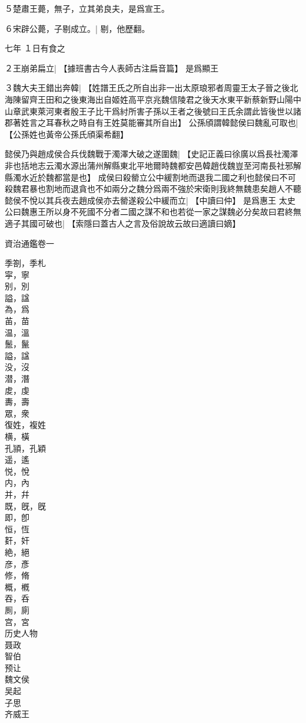 ５楚肅王薨，無子，立其弟良夫，是爲宣王。

６宋辟公薨，子剔成立。|{
	剔，他歷翻。
	}



七年
１日有食之

２王崩弟扁立|{
	【據班書古今人表師古注扁音篇】
	}
是爲顯王

３魏大夫王錯出奔韓|{
	【姓譜王氏之所自出非一出太原琅邪者周靈王太子晉之後北海陳留齊王田和之後東海出自姬姓高平京兆魏信陵君之後天水東平新蔡新野山陽中山章武東萊河東者殷王子比干爲紂所害子孫以王者之後號曰王氏余謂此皆後世以諸郡著姓言之耳春秋之時自有王姓莫能審其所自出】
	}
公孫頎謂韓懿侯曰魏亂可取也|{
	【公孫姓也黃帝公孫氏頎渠希翻】
	}

懿侯乃與趙成侯合兵伐魏戰于濁澤大破之遂圍魏|{
	【史記正義曰徐廣以爲長社濁澤非也括地志云濁水源出蒲州解縣東北平地爾時魏都安邑韓趙伐魏豈至河南長社邪解縣濁水近於魏都當是也】
	}
成侯曰殺罃立公中緩割地而退我二國之利也懿侯曰不可殺魏君暴也割地而退貪也不如兩分之魏分爲兩不強於宋衛則我終無魏患矣趙人不聽懿侯不悅以其兵夜去趙成侯亦去罃遂殺公中緩而立|{
	【中讀曰仲】
	}
是爲惠王
太史公曰魏惠王所以身不死國不分者二國之謀不和也若從一家之謀魏必分矣故曰君終無適子其國可破也|{
	【索隱曰蓋古人之言及俗說故云故曰適讀曰嫡】
	}


資治通鑑卷一
\newpage


季劄，季札\\
寜，寧\\
别，別\\
謚，諡\\
為，爲\\
苖，苗\\
温，溫\\
鬛，鬣\\
謚，諡\\
没，沒\\
潜，潛\\
䖍，虔\\
夀，壽\\
眾，衆\\
復姓，複姓\\
横，橫\\
孔頴，孔穎\\
遥，遙\\
悦，悅\\
内，內\\
并，幷\\
既，旣，旣\\
即，卽\\
恒，恆\\
姧，奸\\
絶，絕\\
彦，彥\\
修，脩\\
概，槪\\
吞，呑\\
厠，廁\\
宫，宮\\

历史人物\\

聂政\\
智伯\\
预让\\
魏文侯\\
吴起\\
子思\\
齐威王\\
